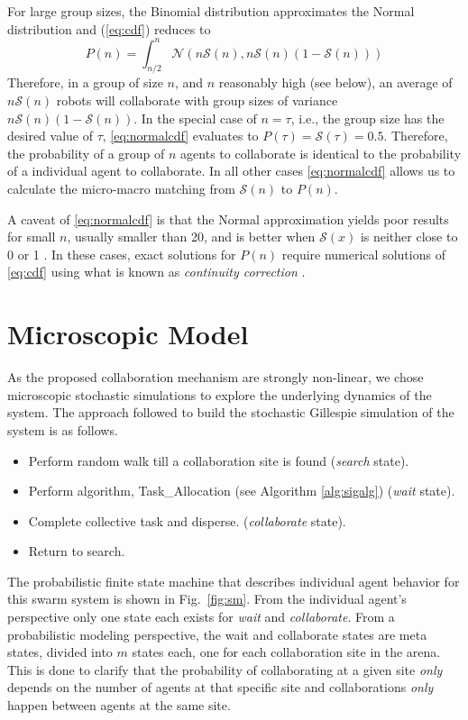 \documentclass{TeXstyles/DARS/svmult}  %
\newcommand{\sig}{\mathcal{S}}
\begin{document}
For large group sizes, the Binomial distribution approximates the Normal distribution and (\ref{eq:cdf}) reduces to 
\begin{equation}
P(n)=\int_{n/2}^{n} \mathcal{N}(n\sig(n),n\sig(n)(1-\sig(n)))\label{eq:normalcdf}
\end{equation}
Therefore, in a group of size $n$, and $n$ reasonably high (see below), an average of $n\sig(n)$ robots will collaborate with group sizes of variance $n\sig(n)(1-\sig(n))$. In the special case of $n=\tau$, i.e., the group size has the desired value of $\tau$, \eqref{eq:normalcdf} evaluates to $P(\tau) = \sig(\tau)=0.5$. Therefore, the probability of a group of $n$ agents to collaborate is identical to the probability of a individual agent to collaborate. In all other cases \eqref{eq:normalcdf} allows us to calculate the micro-macro matching from $\sig(n)$ to $P(n)$.  

A caveat of \eqref{eq:normalcdf} is that the Normal approximation yields poor results for small $n$, usually smaller than 20, and is better when $\sig(x)$ is neither close to 0 or 1 \cite{box78}. In these cases, exact solutions for $P(n)$ require numerical solutions of \eqref{eq:cdf} using what is known as \emph{continuity correction} \cite{Feller1945}. 



\section{Microscopic Model}\label{sec:micromodel}
As the proposed collaboration mechanism are strongly non-linear, we chose microscopic stochastic simulations to explore the underlying dynamics of the system. The approach followed to build the stochastic Gillespie simulation of the system is as follows.
\begin{itemize}
\item Perform random walk till a collaboration site is found (\emph{search} state).
\item Perform algorithm, Task\_Allocation (see Algorithm \ref{alg:sigalg}) (\emph{wait} state).
\item Complete collective task and disperse. (\emph{collaborate} state).
\item Return to search.
\end{itemize}

The probabilistic finite state machine that describes individual agent behavior for this swarm system is shown in Fig.~\ref{fig:sm}. From the individual agent's perspective only one state each exists for \emph{wait} and \emph{collaborate}. From a probabilistic modeling perspective, the wait and collaborate states are meta states, divided into $m$ states each, one for each collaboration site in the arena. This is done to clarify that the probability of collaborating at a given site \emph{only} depends on the number of agents at that specific site and collaborations \emph{only} happen between agents at the same site.
\end{document}
